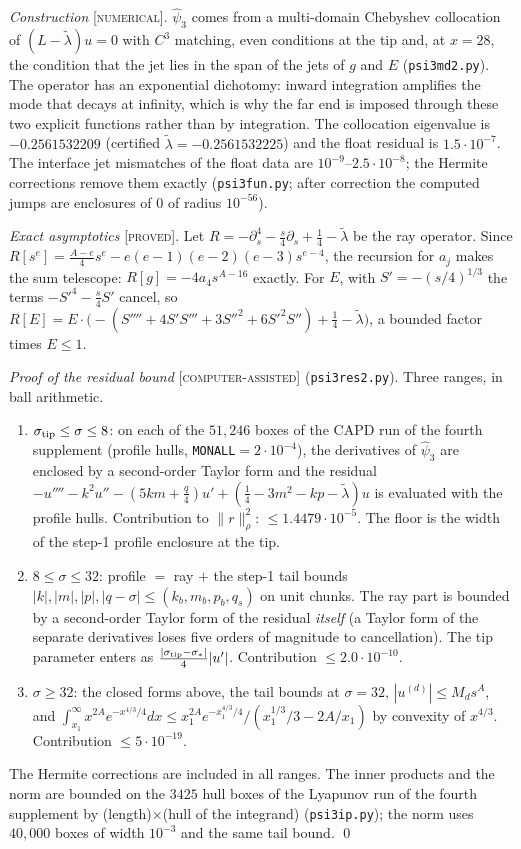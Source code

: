 \documentclass[11pt]{amsart}
\theoremstyle{remark}
\newcommand{\lab}[1]{\textup{\textsc{[#1]}}}
\newcommand{\stip}{\sigma_{\rm tip}}
\begin{document}
\emph{Construction} \lab{numerical}. $\hat\psi_3$ comes from a multi-domain Chebyshev collocation of $(L-\tilde\lambda)u=0$ with $C^3$ matching, even conditions at the tip and, at $x=28$, the condition that the jet lies in the span of the jets of $g$ and $E$ (\texttt{psi3md2.py}). The operator has an exponential dichotomy: inward integration amplifies the mode that decays at infinity, which is why the far end is imposed through these two explicit functions rather than by integration. The collocation eigenvalue is $-0.2561532209$ (certified $\tilde\lambda=-0.2561532225$) and the float residual is $1.5\cdot10^{-7}$. The interface jet mismatches of the float data are $10^{-9}$--$2.5\cdot10^{-8}$; the Hermite corrections remove them exactly (\texttt{psi3fun.py}; after correction the computed jumps are enclosures of $0$ of radius $10^{-56}$).

\emph{Exact asymptotics} \lab{proved}. Let $R=-\partial_s^4-\frac s4\partial_s+\frac14-\tilde\lambda$ be the ray operator. Since $R[s^e]=\frac{A-e}4s^e-e(e-1)(e-2)(e-3)s^{e-4}$, the recursion for $a_j$ makes the sum telescope: $R[g]=-4a_4s^{A-16}$ exactly. For $E$, with $S'=-(s/4)^{1/3}$ the terms $-S'^4-\frac s4S'$ cancel, so $R[E]=E\cdot\big(-(S''''+4S'S'''+3S''^2+6S'^2S'')+\frac14-\tilde\lambda\big)$, a bounded factor times $E\le1$.

\emph{Proof of the residual bound} \lab{computer-assisted} (\texttt{psi3res2.py}). Three ranges, in ball arithmetic.
\begin{enumerate}
\item $\stip\le\sigma\le8$: on each of the $51{,}246$ boxes of the CAPD run of the fourth supplement (profile hulls, \texttt{MONALL}$=2\cdot10^{-4}$), the derivatives of $\hat\psi_3$ are enclosed by a second-order Taylor form and the residual $-u''''-k^2u''-(5km+\frac q4)u'+(\frac14-3m^2-kp-\tilde\lambda)u$ is evaluated with the profile hulls. Contribution to $\|r\|_\rho^2$: $\le1.4479\cdot10^{-5}$. The floor is the width of the step-1 profile enclosure at the tip.
\item $8\le\sigma\le32$: profile $=$ ray $+$ the step-1 tail bounds $|k|,|m|,|p|,|q-\sigma|\le(k_b,m_b,p_b,q_s)$ on unit chunks. The ray part is bounded by a second-order Taylor form of the residual \emph{itself} (a Taylor form of the separate derivatives loses five orders of magnitude to cancellation). The tip parameter enters as $\frac{|\stip-\sigma_*|}4|u'|$. Contribution $\le2.0\cdot10^{-10}$.
\item $\sigma\ge32$: the closed forms above, the tail bounds at $\sigma=32$, $|u^{(d)}|\le M_ds^A$, and $\int_{x_1}^\infty x^{2A}e^{-x^{4/3}/4}dx\le x_1^{2A}e^{-x_1^{4/3}/4}/(x_1^{1/3}/3-2A/x_1)$ by convexity of $x^{4/3}$. Contribution $\le5\cdot10^{-19}$.
\end{enumerate}
The Hermite corrections are included in all ranges. The inner products and the norm are bounded on the $3425$ hull boxes of the Lyapunov run of the fourth supplement by (length)$\times$(hull of the integrand) (\texttt{psi3ip.py}); the norm uses $40{,}000$ boxes of width $10^{-3}$ and the same tail bound. \qed
\end{document}
